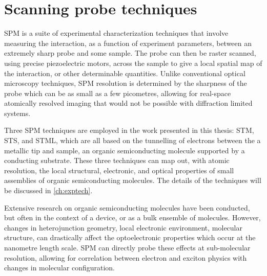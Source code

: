 \section{Scanning probe techniques}


\Acf{SPM} is a suite of experimental characterization techniques that involve measuring the interaction, as a function of experiment parameters, between an extremely sharp probe and some sample. The probe can then be raster scanned, using precise piezoelectric motors, across the sample to give a local spatial map of the interaction, or other determinable quantities. Unlike conventional optical microscopy techniques, \ac{SPM} resolution is determined by the sharpness of the probe which can be as small as a few picometres, allowing for real-space atomically resolved imaging that would not be possible with diffraction limited systems.

Three \ac{SPM} techniques are employed in the work presented in this thesis: \ac{STM}, \ac{STS}, and \ac{STML}, which are all based on the tunnelling of electrons between the a metallic tip and sample, an organic semiconducting molecule supported by a conducting substrate. These three techniques can map out, with atomic resolution, the local structural, electronic, and optical properties of small assemblies of organic semiconducting molecules. The details of the techniques will be discussed in \autoref{ch:exptech}.

Extensive research on organic semiconducting molecules have been conducted, but often in the context of a device, or as a bulk ensemble of molecules. However, changes in heterojunction geometry, local electronic environment, molecular structure, can drastically affect the optoelectronic properties which occur at the nanometre length scale. \ac{SPM} can directly probe these effects at sub-molecular resolution, allowing for correlation between electron and exciton physics with changes in molecular configuration.



